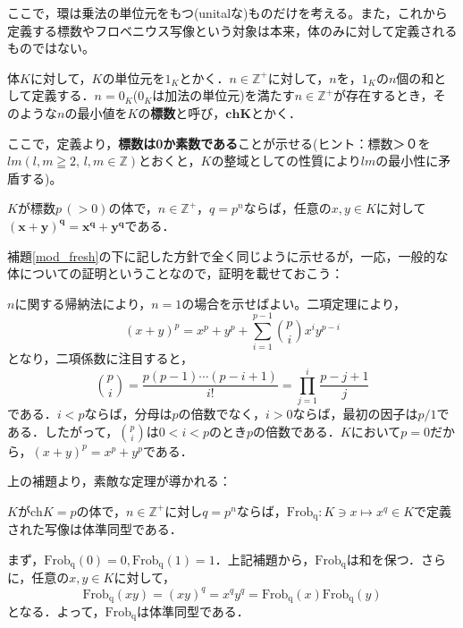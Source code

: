 ここで，環は乗法の単位元をもつ(unitalな)ものだけを考える。また，これから定義する標数やフロベニウス写像という対象は本来，体のみに対して定義されるものではない。

\begin{dfn}[体の標数]\label{ch_def}
  体$K$に対して，$K$の単位元を$1_K$とかく．$n \in \mathbb{Z^{+}}$に対して，$n$を，$1_K$の$n$個の和として定義する．$n=0_K$($0_K$は加法の単位元)を満たす$n \in \mathbb{Z^{+}}$が存在するとき，そのような$n$の最小値を$K$の\textbf{標数}と呼び，$\mathbf{ch}\boldsymbol{K}$とかく．
\end{dfn}

ここで，定義より，\textbf{標数は0か素数である}ことが示せる(ヒント：標数＞０を$lm\left(l,m\geqq 2, \, l,m \in \mathbb{Z}\right)$とおくと，$K$の整域としての性質により$lm$の最小性に矛盾する)。

\begin{lemma}[\textsf{FD}]\label{ch_fresh}
  $K$が標数$p\, (>0)$の体で，$n \in \mathbb{Z^{+}}$，$q=p^n$ならば，任意の$x,y \in K$に対して$\boldsymbol{(x+y)^{q}=x^q+y^q}$である．
\end{lemma}

補題\ref{mod_fresh}の下に記した方針で全く同じように示せるが，一応，一般的な体についての証明ということなので，証明を載せておこう：

\begin{prf}
  $n$に関する帰納法により，$n=1$の場合を示せばよい。二項定理により，
  \[
  (x+y)^p=x^p+y^p+\sum_{i=1}^{p-1}\binom{p}{i}x^i y^{p-i}
  \]
  となり，二項係数に注目すると，
  \[
  \binom{p}{i}=\frac{p(p-1)\cdots(p-i+1)}{i!}=\prod_{j=1}^{i}\frac{p-j+1}{j}
  \]
  である．$i<p$ならば，分母は$p$の倍数でなく，$i>0$ならば，最初の因子は$p/1$である．したがって，$\binom{p}{i}$は$0<i<p$のとき$p$の倍数である．$K$において$p=0$だから，$(x+y)^p=x^p+y^p$である．
\end{prf}

上の補題より，素敵な定理が導かれる：

\begin{thm}
  $K$が$\mathrm{ch}K=p$の体で，$n \in \mathbb{Z}^{+}$に対し$q=p^n$ならば，$\mathrm{Frob_q}:K \ni x \mapsto x^q \in K$で定義された写像は体準同型である．
\end{thm}

\begin{prf}
  まず，$\mathrm{Frob_q}(0)=0,\mathrm{Frob_q}(1)=1$．上記補題から，$\mathrm{Frob_q}$は和を保つ．さらに，任意の$x,y \in K$に対して，
  \[
  \mathrm{Frob_q}(xy)=(xy)^q=x^q y^q=\mathrm{Frob_q}(x)\mathrm{Frob_q}(y)
  \]
  となる．よって，$\mathrm{Frob_q}$は体準同型である．
\end{prf}

